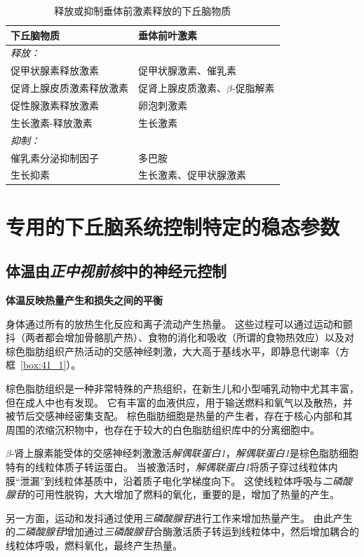 \begin{table}[htbp]
	\caption{释放或抑制垂体前激素释放的下丘脑物质} \label{tab:41_3} \centering
	\begin{tabular}{ll}
		\toprule
		下丘脑物质 & 垂体前叶激素 \\
		\midrule
		\textit{释放：} &  \\
		促甲状腺素释放激素 & 促甲状腺激素、催乳素  \\
		促肾上腺皮质激素释放激素 & 促肾上腺皮质激素、$\beta$-促脂解素  \\
		促性腺激素释放激素 & 卵泡刺激素  \\
		生长激素-释放激素 & 生长激素  \\
		\textit{抑制：} &  \\
		催乳素分泌抑制因子 & 多巴胺  \\
		生长抑素 & 生长激素、促甲状腺激素  \\
		\bottomrule
	\end{tabular}
\end{table}



\section{专用的下丘脑系统控制特定的稳态参数}

\subsection{体温由\textit{正中视前核}中的神经元控制}

\textbf{体温反映热量产生和损失之间的平衡}

身体通过所有的放热生化反应和离子流动产生热量。
这些过程可以通过运动和颤抖（两者都会增加骨骼肌产热）、食物的消化和吸收（所谓的食物热效应）以及对棕色脂肪组织产热活动的交感神经刺激，大大高于基线水平，即静息代谢率（方框~\ref{box:41_1}）。


\begin{proposition} \label{box:41_1}
	
	\quad \quad 棕色脂肪组织是一种非常特殊的产热组织，在新生儿和小型哺乳动物中尤其丰富，但在成人中也有发现。
	它有丰富的血液供应，用于输送燃料和氧气以及散热，并被节后交感神经密集支配。
	棕色脂肪细胞是热量的产生者，存在于核心内部和其周围的浓缩沉积物中，也存在于较大的白色脂肪组织库中的分离细胞中。
	
	\quad \quad $\beta$-肾上腺素能受体的交感神经刺激激活\textit{解偶联蛋白1}，\textit{解偶联蛋白1}是棕色脂肪细胞特有的线粒体质子转运蛋白。
	当被激活时，\textit{解偶联蛋白1}将质子穿过线粒体内膜“泄漏”到线粒体基质中，沿着质子电化学梯度向下。
	这使线粒体呼吸与\textit{二磷酸腺苷}的可用性脱钩，大大增加了燃料的氧化，重要的是，增加了热量的产生。
	
	\quad \quad 另一方面，运动和发抖通过使用\textit{三磷酸腺苷}进行工作来增加热量产生。
	由此产生的\textit{二磷酸腺苷}增加通过\textit{三磷酸腺苷}合酶激活质子转运到线粒体中，然后增加耦合的线粒体呼吸，燃料氧化，最终产生热量。
	
\end{proposition}


